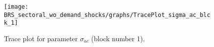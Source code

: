 \begin{figure}[H]
\centering
  \texttt{[image: BRS\_sectoral\_wo\_demand\_shocks/graphs/TracePlot\_sigma\_ac\_blck\_1]}\\
    \caption{Trace plot for parameter ${\sigma_{ac}}$ (block number 1).}
\end{figure}
